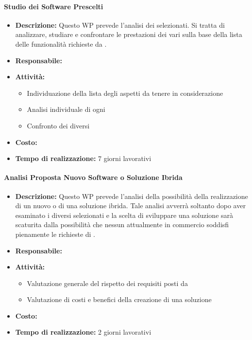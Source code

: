 \paragraph{Studio dei Software Prescelti}
\begin{itemize}
\item{\bfseries Descrizione:}  Questo WP prevede l'analisi dei  selezionati. Si tratta di analizzare, studiare e confrontare le prestazioni dei vari \sw sulla base della lista delle funzionalità richieste da \customer.
\item {\bfseries Responsabile:}
\item  {\bfseries Attività:}
\begin{itemize}

		\item Individuazione della lista degli aspetti da tenere in considerazione
		\item Analisi individuale di ogni 
		\item Confronto dei diversi 
		\end{itemize}

\item  {\bfseries Costo:}
\item  {\bfseries Tempo di realizzazione:} 7 giorni lavorativi
\end{itemize}


\paragraph{Analisi Proposta Nuovo Software o Soluzione Ibrida }
\begin{itemize}
\item{\bfseries Descrizione:} Questo WP prevede l'analisi della possibilità della realizzazione di un nuovo  o di una soluzione ibrida. Tale analisi avverrà soltanto dopo aver esaminato i diversi  selezionati e la scelta di sviluppare una soluzione  sarà scaturita dalla possibilità che nessun  attualmente in commercio soddisfi pienamente le richieste di \customer.
\item {\bfseries Responsabile:}
\item  {\bfseries Attività:}
	

	\begin{itemize}
\item Valutazione generale del rispetto dei requisiti posti da \customer 
		\item Valutazione di costi e benefici della creazione di una soluzione  
		\end{itemize}
\item  {\bfseries Costo:}
\item  {\bfseries Tempo di realizzazione:} 2 giorni lavorativi
\end{itemize}




